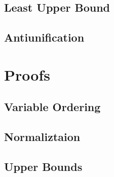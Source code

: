 \documentclass[a4,natbib=false]{article}
\begin{document}
\subsection{Least Upper Bound}
\ottdefnsLUB

\subsection{Antiunification}
\ottdefnsAU

\section{Proofs}

\subsection{Variable Ordering}




\subsection{Normaliztaion}



\subsection{Upper Bounds}


\end{document}
